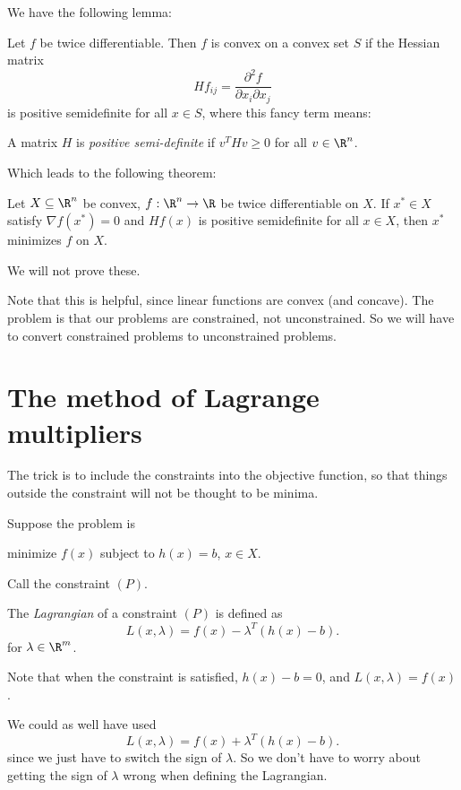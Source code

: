 \documentclass[a4paper]{article}
\begin{document}
We have the following lemma:
\begin{lemma}
  Let $f$ be twice differentiable. Then $f$ is convex on a convex set $S$ if the Hessian matrix
  \[
    Hf_{ij} = \frac{\partial^2 f}{\partial x_i \partial x_j}
  \]
  is positive semidefinite for all $x\in S$, where this fancy term means:
\end{lemma}

\begin{defi}
  A matrix $H$ is \emph{positive semi-definite} if $v^T Hv \geq 0$ for all $v\in \R^n$.
\end{defi}

Which leads to the following theorem:
\begin{thm}
  Let $X\subseteq \R^n$ be convex, $f: \R^n \to \R$ be twice differentiable on $X$. If $x^* \in X$ satisfy $\nabla f(x^*) = 0$ and $Hf(x)$ is positive semidefinite for all $x\in X$, then $x^*$ minimizes $f$ on $X$.
\end{thm}
We will not prove these.

Note that this is helpful, since linear functions are convex (and concave). The problem is that our problems are constrained, not unconstrained. So we will have to convert constrained problems to unconstrained problems.

\section{The method of Lagrange multipliers}
The trick is to include the constraints into the objective function, so that things outside the constraint will not be thought to be minima.

Suppose the problem is
\begin{center}
  minimize $f(x)$ subject to $h(x) = b$, $x\in X$.
\end{center}
Call the constraint $(P)$.
\begin{defi}[Lagrangian]
  The \emph{Lagrangian} of a constraint $(P)$ is defined as
  \[
    L(x, \lambda) = f(x) - \lambda^T(h(x) - b).
  \]
  for $\lambda\in \R^m$.
\end{defi}
Note that when the constraint is satisfied, $h(x) - b = 0$, and $L(x, \lambda) = f(x)$.

We could as well have used
\[
  L(x, \lambda) = f(x) + \lambda^T(h(x) - b).
\]
since we just have to switch the sign of $\lambda$. So we don't have to worry about getting the sign of $\lambda$ wrong when defining the Lagrangian.
\end{document}
